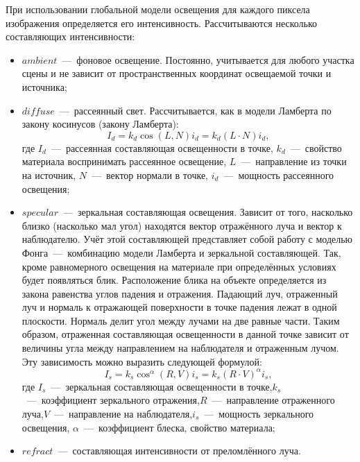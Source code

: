 При использовании глобальной модели освещения для каждого пиксела изображения определяется его интенсивность. Рассчитываются несколько составляющих интенсивности:
\begin{itemize}
	\item $ambient$~---~фоновое освещение. Постоянно, учитывается для любого участка сцены и не зависит от пространственных координат освещаемой точки и источника;
	\item $diffuse$~---~рассеянный свет. Рассчитывается, как в модели Ламберта по закону косинусов (закону Ламберта): \begin{equation}
		I_d = k_d\cos (L, N)i_d = k_d(L \cdot N)i_d,
	\end{equation}
	где $I_d$~---~рассеянная составляющая освещенности в точке, $k_d$~---~свойство материала воспринимать рассеянное освещение, $L$~---~направление из точки на источник, $N$~---~вектор нормали в точке, $i_d$~---~мощность рассеянного освещения;
	\item $specular$~---~зеркальная составляющая освещения. Зависит от того, насколько близко (насколько мал угол) находятся вектор отражённого луча и вектор к наблюдателю. Учёт этой составляющей представляет собой работу с моделью Фонга~---~комбинацию модели Ламберта и зеркальной составляющей. Так, кроме равномерного освещения на материале при определённых условиях будет появляться блик. Расположение блика на объекте определяется из закона равенства углов падения и отражения. Падающий луч, отраженный луч и нормаль к отражающей поверхности в точке падения лежат в одной плоскости. Нормаль делит угол между лучами на две равные части. Таким образом, отраженная составляющая освещенности в данной точке зависит от величины угла между направлением на наблюдателя и отраженным лучом. Эту зависимость можно выразить следующей формулой: \begin{equation}
		I_s = k_s\cos^{\alpha} (R, V)i_s = k_s(R \cdot V)^{\alpha}i_s,
	\end{equation}
	где $I_s$~---~зеркальная составляющая освещенности в точке,$k_s$~---~коэффициент зеркального отражения,$R$~---~направление отраженного луча,$V$~---~направление на наблюдателя,$i_s$~---~мощность зеркального освещения, $\alpha$~---~коэффициент блеска, свойство материала;
	\item $refract$~---~составляющая интенсивности от преломлённого луча.
\end{itemize}

